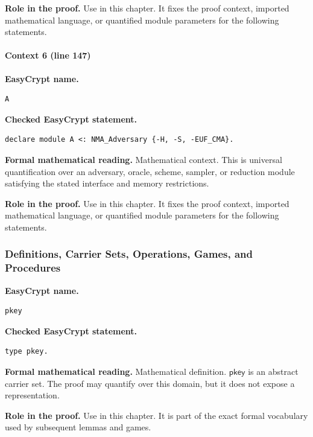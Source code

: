 \noindent\textbf{Role in the proof.}
Use in this chapter. It fixes the proof context, imported mathematical language, or quantified module parameters for the following statements.

\paragraph{Context 6 (line 147)}
\noindent\textbf{EasyCrypt name.}
\begin{lstlisting}[language=EasyCrypt,basicstyle=\ttfamily\scriptsize]
A
\end{lstlisting}
\noindent\textbf{Checked EasyCrypt statement.}
\begin{lstlisting}[language=EasyCrypt,basicstyle=\ttfamily\scriptsize]
declare module A <: NMA_Adversary {-H, -S, -EUF_CMA}.
\end{lstlisting}
\noindent\textbf{Formal mathematical reading.}
Mathematical context. This is universal quantification over an adversary, oracle, scheme, sampler, or reduction module satisfying the stated interface and memory restrictions.

\noindent\textbf{Role in the proof.}
Use in this chapter. It fixes the proof context, imported mathematical language, or quantified module parameters for the following statements.

\subsubsection*{Definitions, Carrier Sets, Operations, Games, and Procedures}
\begin{formaldefinition}
\noindent\textbf{EasyCrypt name.}
\begin{lstlisting}[language=EasyCrypt,basicstyle=\ttfamily\scriptsize]
pkey
\end{lstlisting}
\noindent\textbf{Checked EasyCrypt statement.}
\begin{lstlisting}[language=EasyCrypt,basicstyle=\ttfamily\scriptsize]
type pkey.
\end{lstlisting}
\noindent\textbf{Formal mathematical reading.}
Mathematical definition. \(\mathsf{pkey}\) is an abstract carrier set.  The proof may quantify over this domain, but it does not expose a representation.

\noindent\textbf{Role in the proof.}
Use in this chapter. It is part of the exact formal vocabulary used by subsequent lemmas and games.

\end{formaldefinition}

